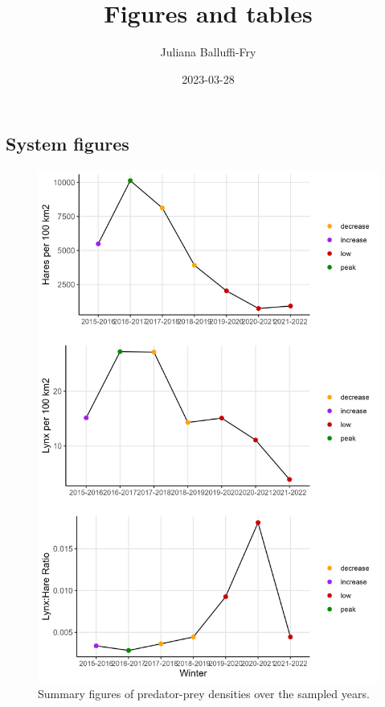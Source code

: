 \documentclass[
]{article}
\title{Figures and tables}
\author{Juliana Balluffi-Fry}
\date{2023-03-28}
\begin{document}
\maketitle

\hypertarget{system-figures}{%
\subsection{System figures}\label{system-figures}}

\begin{figure}
\centering
\includegraphics{output/figures/densities.jpeg}
\caption{Summary figures of predator-prey densities over the sampled
years.}
\end{figure}
\end{document}
